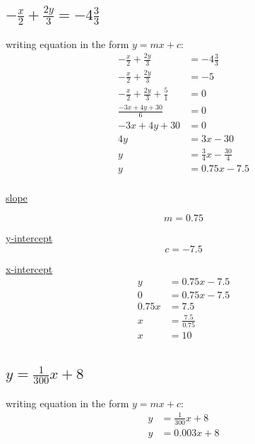 \documentclass{article}
\begin{document}
\subsection{$-\frac{x}{2}+\frac{2y}{3}=-4\frac{3}{3}$}
writing equation in the form $y=mx+c$:
$$
    \begin{aligned}
        -\frac{x}{2}+\frac{2y}{3}               & =-4\frac{3}{3}                \\
        -\frac{x}{2}+\frac{2y}{3}               & =-5                           \\
        -\frac{x}{2}+\frac{2y}{3} + \frac{5}{1} & = 0                           \\
        \frac{-3x+4y+30}{6}                     & = 0                           \\
        -3x+4y+30                               & = 0                           \\
        4y                                      & = 3x-30                       \\
        y                                       & = \frac{3}{4}x - \frac{30}{4} \\
        y                                       & = 0.75x - 7.5                 \\
    \end{aligned}
$$

\underline{slope}

$$
    m=0.75
$$

\underline{y-intercept}
$$
    c = -7.5
$$

\underline{x-intercept}
$$
    \begin{aligned}
        y     & = 0.75x - 7.5      \\
        0     & = 0.75x - 7.5      \\
        0.75x & = 7.5              \\
        x     & = \frac{7.5}{0.75} \\
        x     & = 10               \\
    \end{aligned}
$$

\subsection{$y=\frac{1}{300}x+8$}
writing equation in the form $y=mx+c$:
$$
    \begin{aligned}
        y & = \frac{1}{300}x+8 \\
        y & = 0.003x + 8       \\
    \end{aligned}
$$
\end{document}
